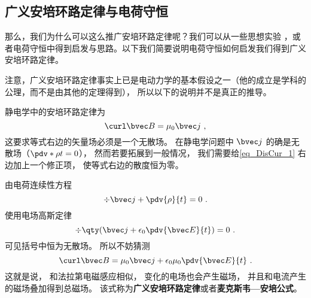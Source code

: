 \subsection{广义安培环路定律与电荷守恒}
那么，我们为什么可以这么推广安培环路定律呢？我们可以从一些思想实验
，或者电荷守恒中得到启发与思路。以下我们简要说明电荷守恒如何启发我们得到广义安培环路定律。

注意，广义安培环路定律事实上已是电动力学的基本假设之一（他的成立是学科的公理，而不是由其他的定理得到）， 所以以下的说明并不是真正的推导。

静电学中的安培环路定律为
\begin{equation}\label{eq_DisCur_1}
\curl\bvec B = \mu_0\bvec j~,
\end{equation}
这要求等式右边的矢量场必须是一个无散场。 在静电学问题中 $\bvec j$ 的确是无散场（$\pdv*{\rho}{t} = 0$）， 然而若要拓展到一般情况， 我们需要给\autoref{eq_DisCur_1} 右边加上一个修正项， 使等式右边的散度恒为零。

由电荷连续性方程
\begin{equation}
\div \bvec j + \pdv{\rho}{t} = 0~.
\end{equation}
使用电场高斯定律
\begin{equation}
\div \qty(\bvec j + \epsilon_0\pdv{\bvec E}{t}) = 0~.
\end{equation}
可见括号中恒为无散场。 所以不妨猜测
\begin{equation}
\curl\bvec B = \mu_0\bvec j + \epsilon_0\mu_0\pdv{\bvec E}{t}~.
\end{equation}
这就是说， 和法拉第电磁感应相似， 变化的电场也会产生磁场， 并且和电流产生的磁场叠加得到总磁场。 该式称为\textbf{广义安培环路定律}或者\textbf{麦克斯韦—安培公式}。
